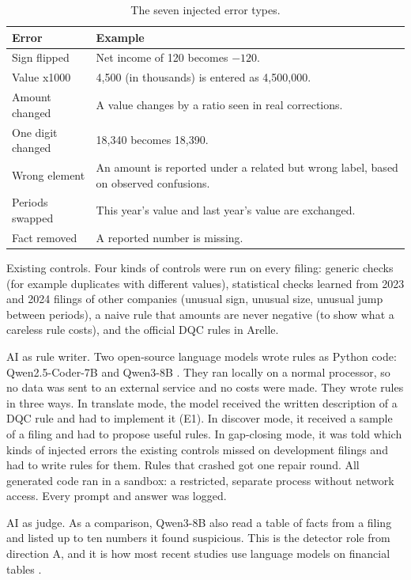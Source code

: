 \documentclass[11pt,a4paper]{article}
\begin{document}
\begin{table}[htbp]
\centering
\small
\begin{tabularx}{\textwidth}{@{}p{3.4cm}L@{}}
\toprule
Error & Example \\
\midrule
Sign flipped & Net income of 120 becomes $-120$. \\
Value x1000 & 4{,}500 (in thousands) is entered as 4{,}500{,}000. \\
Amount changed & A value changes by a ratio seen in real corrections. \\
One digit changed & 18{,}340 becomes 18{,}390. \\
Wrong element & An amount is reported under a related but wrong label, based on observed confusions. \\
Periods swapped & This year's value and last year's value are exchanged. \\
Fact removed & A reported number is missing. \\
\bottomrule
\end{tabularx}
\caption{The seven injected error types.}
\label{tab:ops}
\end{table}

Existing controls. Four kinds of controls were run on every filing: generic checks (for example duplicates with different values), statistical checks learned from 2023 and 2024 filings of other companies (unusual sign, unusual size, unusual jump between periods), a naive rule that amounts are never negative (to show what a careless rule costs), and the official DQC rules in Arelle.

AI as rule writer. Two open-source language models wrote rules as Python code: Qwen2.5-Coder-7B and Qwen3-8B \cite{qwen25coder,qwen3}. They ran locally on a normal processor, so no data was sent to an external service and no costs were made. They wrote rules in three ways. In translate mode, the model received the written description of a DQC rule and had to implement it (E1). In discover mode, it received a sample of a filing and had to propose useful rules. In gap-closing mode, it was told which kinds of injected errors the existing controls missed on development filings and had to write rules for them. Rules that crashed got one repair round. All generated code ran in a sandbox: a restricted, separate process without network access. Every prompt and answer was logged.

AI as judge. As a comparison, Qwen3-8B also read a table of facts from a filing and listed up to ten numbers it found suspicious. This is the detector role from direction A, and it is how most recent studies use language models on financial tables \cite{finauditing,secfintables}.
\end{document}
